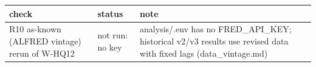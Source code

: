 \begin{tabular}{p{4.2cm}p{2.6cm}p{8.6cm}}
\toprule
check & status & note \\
\midrule
R10 as-known (ALFRED vintage) rerun of W-HQ12 & not run: no key & analysis/.env has no FRED\_API\_KEY; historical v2/v3 results use revised data with fixed lags (data\_vintage.md) \\
\bottomrule
\end{tabular}
